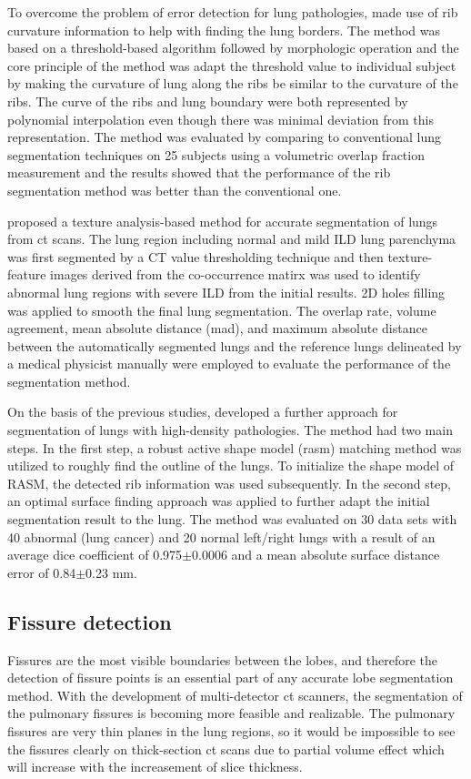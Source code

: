 To overcome the problem of error detection for lung pathologies, \citep{prasad2008automatic} made use of rib curvature information to help with finding the lung borders. The method was based on a threshold-based algorithm followed by morphologic operation and the core principle of the method was adapt the threshold value to individual subject by making the curvature of lung along the ribs be similar to the curvature of the ribs. The curve of the ribs and lung boundary were both represented by polynomial interpolation even though there was minimal deviation from this representation. The method was evaluated by comparing to conventional lung segmentation techniques on 25 subjects using a volumetric overlap fraction measurement and the results showed that the performance of the rib segmentation method was better than the conventional one.

\cite{wang2009automated} proposed a texture analysis-based method for accurate segmentation of lungs from \gls{ct} scans. The lung region including normal and mild ILD lung parenchyma was first segmented by a CT value thresholding technique and then texture-feature images derived from the co-occurrence matirx was used to identify abnormal lung regions with severe ILD from the initial results. 2D holes filling was applied to smooth the final lung segmentation. The overlap rate, volume agreement, mean absolute distance (\gls{mad}), and maximum absolute distance between the automatically segmented lungs and the reference lungs delineated by a medical physicist manually were employed to evaluate the performance of the segmentation method.

On the basis of the previous studies, \citep{sun2012automated} developed a further approach for segmentation of lungs with high-density pathologies. The method had two main steps. In the first step, a robust active shape model (\gls{rasm}) matching method was utilized to roughly find the outline of the lungs. To initialize the shape model of RASM, the detected rib information was used subsequently. In the second step, an optimal surface finding approach was applied to further adapt the initial segmentation result to the lung. The method was evaluated on 30 data sets with 40 abnormal (lung cancer) and 20 normal left/right lungs with a result of an average dice coefficient of 0.975$ \pm $0.0006 and a mean absolute surface distance error of 0.84$ \pm $0.23 mm.
\subsection{Fissure detection}
Fissures are the most visible boundaries between the lobes, and therefore the detection of fissure points is an essential part of any accurate lobe segmentation method. With the development of multi-detector \gls{ct} scanners, the segmentation of the pulmonary fissures is becoming more feasible and realizable. The pulmonary fissures are very thin planes in the lung regions, so it would be impossible to see the fissures clearly on thick-section \gls{ct} scans due to partial volume effect which will increase with the increasement of slice thickness.

